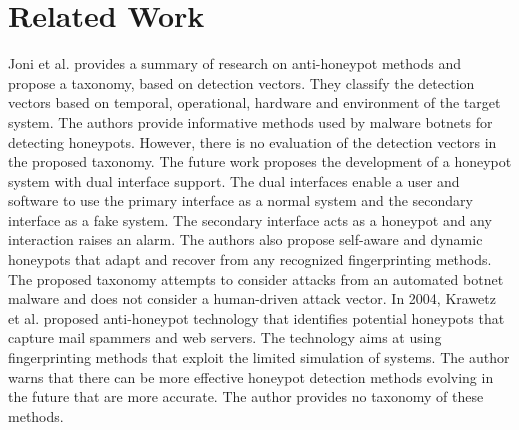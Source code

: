 \section{Related Work}
\label{sec:rw}

Joni et al. \cite{Joni} provides a  summary of research on anti-honeypot methods and propose a taxonomy, based on detection vectors. They classify the detection vectors based on temporal, operational, hardware and environment of the target system. The authors provide informative methods used by malware botnets for detecting honeypots. However, there is no evaluation of the detection vectors in the proposed taxonomy. The future work proposes the development of a honeypot system with dual interface support. The dual interfaces enable a user and software to use the primary interface as a normal system and the secondary interface as a fake system. The secondary interface acts as a honeypot and any interaction raises an alarm. The authors also propose self-aware and dynamic honeypots that adapt and recover from any recognized fingerprinting methods. The proposed taxonomy attempts to consider attacks from an automated botnet malware and does not consider a human-driven attack vector. In 2004, Krawetz et al. \cite{krawetz2004anti} proposed anti-honeypot technology that identifies potential honeypots that capture mail spammers and web servers. The technology aims at using fingerprinting methods that exploit the limited simulation of systems. The author warns that there can be more effective honeypot detection methods evolving in the future that are more accurate. The author provides no taxonomy of these methods. 
